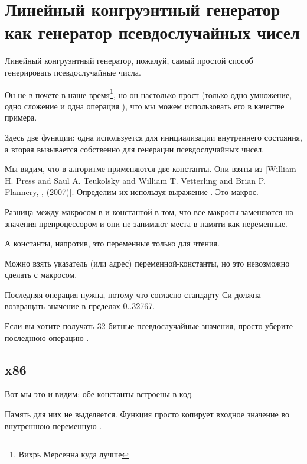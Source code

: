 \section[Линейный конгруэнтный генератор]{Линейный конгруэнтный генератор как генератор псевдослучайных чисел}
\label{LCG_simple}

Линейный конгруэнтный генератор, пожалуй, самый простой способ генерировать псевдослучайные числа.

Он не в почете в наше время\footnote{Вихрь Мерсенна куда лучше}, но он настолько прост
(только одно умножение, одно сложение и одна операция ),
что мы можем использовать его в качестве примера.



Здесь две функции: одна используется для инициализации внутреннего состояния, а вторая
вызывается собственно для генерации псевдослучайных чисел.

Мы видим, что в алгоритме применяются две константы.
Они взяты из
[William H. Press and Saul A. Teukolsky and William T. Vetterling and Brian P. Flannery, , (2007)].
Определим их используя выражение \CCpp {}. Это макрос.

Разница между макросом в \CCpp и константой в том, что все макросы заменяются на значения препроцессором
\CCpp и они не занимают места в памяти как переменные.

А константы, напротив, это переменные только для чтения.

Можно взять указатель (или адрес) переменной-константы, но это невозможно сделать с макросом.

Последняя операция  нужна, потому что согласно стандарту Си  должна возвращать значение в пределах
0..32767.

Если вы хотите получать 32-битные псевдослучайные значения, просто уберите последнюю операцию .

\subsection{x86}



Вот мы это и видим: обе константы встроены в код.

Память для них не выделяется.
Функция  просто копирует входное значение во внутреннюю переменную .

